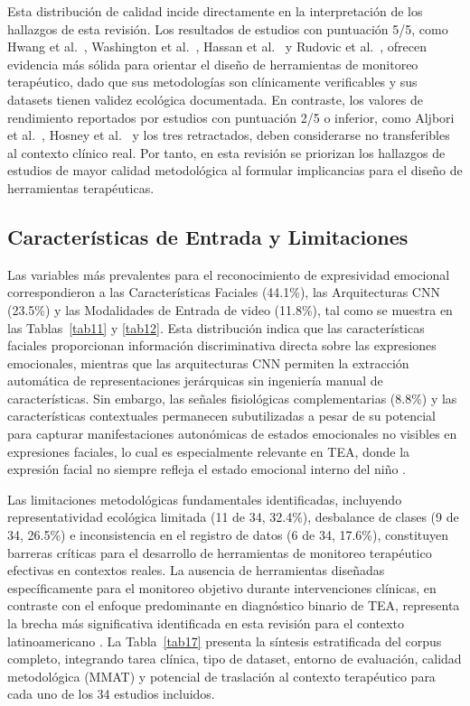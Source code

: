 \documentclass[ASNA,twocolumn]{USG}
\begin{document}
	Esta distribución de calidad incide directamente en la interpretación de
	los hallazgos de esta revisión. Los resultados de estudios con puntuación 5/5, como
	Hwang et al.\ \cite{Hwang2024}, Washington et al.\ \cite{Washington2022}, Hassan
	et al.\ \cite{Hassan2025} y Rudovic et al.\ \cite{Rudovic2018,Rudovic2019}, ofrecen
	evidencia más sólida para orientar el diseño de herramientas de monitoreo
	terapéutico, dado que sus metodologías son clínicamente verificables y sus datasets
	tienen validez ecológica documentada. En contraste, los valores de rendimiento
	reportados por estudios con puntuación 2/5 o inferior, como Aljbori et al.\
	\cite{Aljbori2025}, Hosney et al.\ \cite{Hosney2024} y los tres retractados, deben
	considerarse no transferibles al contexto clínico real. Por tanto, en esta revisión
	se priorizan los hallazgos de estudios de mayor calidad metodológica al formular
	implicancias para el diseño de herramientas terapéuticas.
	
	\subsection{Características de Entrada y Limitaciones}\label{sec6c}
	
	Las variables más prevalentes para el reconocimiento de expresividad emocional
	correspondieron a las Características Faciales (44.1\%), las Arquitecturas CNN
	(23.5\%) y las Modalidades de Entrada de video (11.8\%), tal como se muestra en
	las Tablas~\ref{tab11} y \ref{tab12}. Esta distribución indica que las
	características faciales proporcionan información discriminativa directa sobre las
	expresiones emocionales, mientras que las arquitecturas CNN permiten la extracción
	automática de representaciones jerárquicas sin ingeniería manual de características.
	Sin embargo, las señales fisiológicas complementarias (8.8\%) y las características
	contextuales permanecen subutilizadas a pesar de su potencial para capturar
	manifestaciones autonómicas de estados emocionales no visibles en expresiones
	faciales, lo cual es especialmente relevante en TEA, donde la expresión facial no siempre refleja el estado emocional interno del niño
	\cite{Rudovic2018,Rudovic2019}.
	
	Las limitaciones metodológicas fundamentales identificadas, incluyendo
	representatividad ecológica limitada (11 de 34, 32.4\%), desbalance de clases
	(9 de 34, 26.5\%) e inconsistencia en el registro de datos (6 de 34, 17.6\%),
	constituyen barreras críticas para el desarrollo de herramientas de monitoreo
	terapéutico efectivas en contextos reales. La ausencia de herramientas diseñadas
	específicamente para el monitoreo objetivo durante intervenciones clínicas, en
	contraste con el enfoque predominante en diagnóstico binario de TEA, representa la
	brecha más significativa identificada en esta revisión para el contexto
	latinoamericano \cite{Ahmad2024,Alsubai2025}. La Tabla~\ref{tab17} presenta la
	síntesis estratificada del corpus completo, integrando tarea clínica, tipo de
	dataset, entorno de evaluación, calidad metodológica (MMAT) y potencial de
	traslación al contexto terapéutico para cada uno de los 34 estudios incluidos.
	
\end{document}
